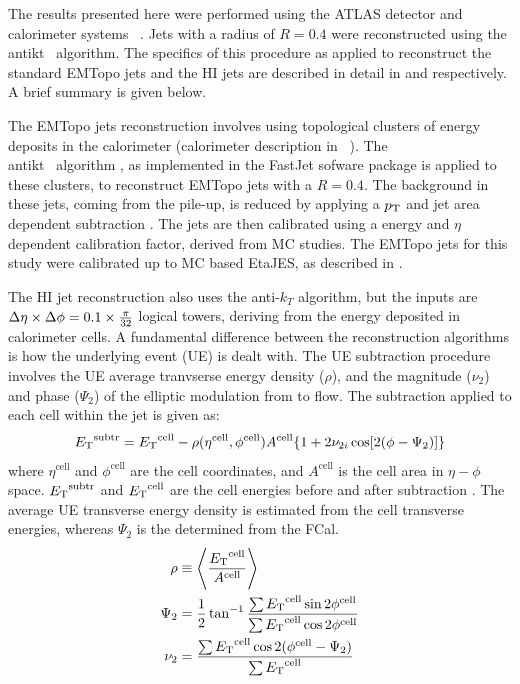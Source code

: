 The results presented here were performed using the ATLAS detector and calorimeter systems ~\cite{Aad:2008zzm}. Jets with a radius of $R=0.4$ were reconstructed using the \\antikt \ algorithm.  The specifics of this procedure as applied to reconstruct the standard EMTopo jets and the HI jets are described in detail in \cite{Aad:pp_algo} and \cite{Aad:hi_jets} respectively. A brief summary is given below.

The EMTopo jets reconstruction involves using topological clusters of energy deposits in the calorimeter (calorimeter description in ~\cite{Aad:2008zzm}). The \\antikt \ algorithm \cite{antikt_algo}, as implemented in the FastJet sofware package \cite{fastjet_algo} is applied to these clusters, to reconstruct EMTopo jets with a $R = 0.4$.  The background in these jets, coming from the pile-up, is reduced by applying a $\mbox{$p_{\mathrm{T}}$}$ and jet area dependent subtraction \cite{pp_pileup_subtr}. The jets are then calibrated using a energy and $\eta$ dependent calibration factor, derived from MC studies. The EMTopo jets for this study were calibrated up to MC based EtaJES, as described in \cite{CalibReco}.

The HI jet reconstruction also uses the anti-$k_{T}$ algorithm, but the inputs are $\mbox{$\Delta \eta$} \times \mbox{$\Delta \phi$} = 0.1 \times \frac{\pi}{32}$ logical towers, deriving from the energy deposited in calorimeter cells. A fundamental difference between the reconstruction algorithms is how the underlying event (UE) is dealt with. The UE subtraction procedure involves the UE average tranvserse energy density ($\rho$), and the magnitude ($\nu_{2}$) and phase ($\Psi_{2}$) of the elliptic modulation from to flow. The subtraction applied to each cell within the jet is given as: 
\begin{align}
\mbox{$E_{\mathrm{T}}$}^{\mathrm{subtr}} = \mbox{$E_{\mathrm{T}}$}^{\mathrm{cell}} - \rho(\eta^{\mathrm{cell}},\phi^{\mathrm{cell}})A^{\mathrm{cell}} \{1 + 2\nu_{2 i}\cos[2(\phi - \Psi_2)]\}
\end{align}
where $\eta^{\mathrm{cell}}$ and $\phi^{\mathrm{cell}}$ are the cell coordinates, and $A^{\mathrm{cell}}$ is the cell area in $\eta-\phi$ space. $\mbox{$E_{\mathrm{T}}$}^{\mathrm{subtr}}$ and $ \mbox{$E_{\mathrm{T}}$}^{\mathrm{cell}}$ are the cell energies before and after subtraction \cite{HIjesnote}. The average UE transverse energy density is estimated from the cell transverse energies, whereas $\Psi_2$ is the determined from the FCal.
\begin{align}
\rho &\equiv \left\langle \frac{\mbox{$E_{\mathrm{T}}$}^{\mathrm{cell}}}{A^{\mathrm{cell}}}\right\rangle \\
\Psi_2 &= \frac{1}{2} \tan^{-1}\frac{\sum \mbox{$E_{\mathrm{T}}$}^{\mathrm{cell}} \sin 2\phi^{\mathrm{cell}} }{\sum \mbox{$E_{\mathrm{T}}$}^{\mathrm{cell}} \cos 2\phi^{\mathrm{cell}} } \\
\nu_2 &= \frac{\sum \mbox{$E_{\mathrm{T}}$}^{\mathrm{cell}} \cos 2(\phi^{\mathrm{cell}} - \Psi_2) }{\sum \mbox{$E_{\mathrm{T}}$}^{\mathrm{cell}}}
\end{align}

